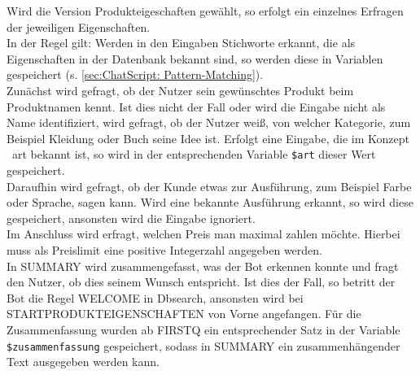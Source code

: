 Wird die Version Produkteigeschaften gewählt, so erfolgt ein einzelnes Erfragen der jeweiligen Eigenschaften.\\
In der Regel gilt: Werden in den Eingaben Stichworte erkannt, die als Eigenschaften in der Datenbank bekannt sind, so werden diese in Variablen gespeichert (s. \ref{sec:ChatScript: Pattern-Matching}).\\
Zunächst wird gefragt, ob der Nutzer sein gewünschtes Produkt beim Produktnamen kennt. Ist dies nicht der Fall oder wird die Eingabe nicht als Name identifiziert, wird gefragt, ob der Nutzer weiß, von welcher Kategorie, zum Beispiel Kleidung oder Buch seine Idee ist. Erfolgt eine Eingabe, die im Konzept ~art bekannt ist, so wird in der entsprechenden Variable \lstinline|$art| dieser Wert gespeichert.\\
Daraufhin wird gefragt, ob der Kunde etwas zur Ausführung, zum Beispiel Farbe oder Sprache, sagen kann. Wird eine bekannte Ausführung erkannt, so wird diese gespeichert, ansonsten wird die Eingabe ignoriert.\\
Im Anschluss wird erfragt, welchen Preis man maximal zahlen möchte. Hierbei muss als Preislimit eine positive Integerzahl angegeben werden.\\ 
In SUMMARY wird zusammengefasst, was der Bot erkennen konnte und fragt den Nutzer, ob dies seinem Wunsch entspricht. Ist dies der Fall, so betritt der Bot die Regel WELCOME in Dbsearch, ansonsten wird bei STARTPRODUKTEIGENSCHAFTEN von Vorne angefangen. Für die Zusammenfassung wurden ab FIRSTQ ein entsprechender Satz in der Variable \lstinline|$zusammenfassung| gespeichert, sodass in SUMMARY ein zusammenhängender Text ausgegeben werden kann.



